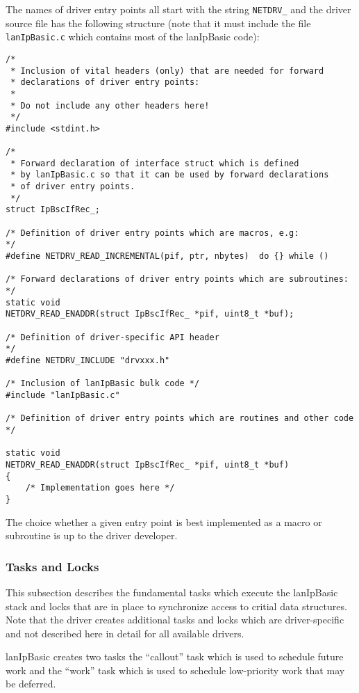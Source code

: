 \documentclass{article}
\newcommand{\lip}{lanIpBasic}
\newcommand{\lipf}[1]{{\tt #1}}
\newcommand{\cmd}[1]{{\tt #1}}
\begin{document}
The names of driver entry points all start with the
string \cmd{NETDRV\_} and the driver source file has
the following structure (note that it must include
the file \lipf{lanIpBasic.c} which contains most of
the \lip{} code):

\begin{verbatim}
/*
 * Inclusion of vital headers (only) that are needed for forward
 * declarations of driver entry points:
 *
 * Do not include any other headers here!
 */
#include <stdint.h>

/*
 * Forward declaration of interface struct which is defined
 * by lanIpBasic.c so that it can be used by forward declarations
 * of driver entry points.
 */
struct IpBscIfRec_;

/* Definition of driver entry points which are macros, e.g:            */
#define NETDRV_READ_INCREMENTAL(pif, ptr, nbytes)  do {} while ()

/* Forward declarations of driver entry points which are subroutines:  */
static void
NETDRV_READ_ENADDR(struct IpBscIfRec_ *pif, uint8_t *buf);

/* Definition of driver-specific API header                            */
#define NETDRV_INCLUDE "drvxxx.h"

/* Inclusion of lanIpBasic bulk code */
#include "lanIpBasic.c"

/* Definition of driver entry points which are routines and other code */

static void
NETDRV_READ_ENADDR(struct IpBscIfRec_ *pif, uint8_t *buf)
{
	/* Implementation goes here */
}

\end{verbatim}

The choice whether a given entry point is best implemented as
a macro or subroutine is up to the driver developer.

    \subsubsection{Tasks and Locks}
This subsection describes the fundamental tasks which
execute the \lip{} stack and locks that are in place to
synchronize access to critial data structures. Note
that the driver creates additional tasks and locks which
are driver-specific and not described here in detail for
all available drivers.

\lip{} creates two tasks the ``callout'' task which is used
to schedule future work and the ``work'' task which is used
to schedule low-priority work that may be deferred.
\end{document}

